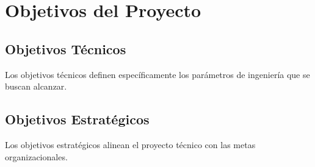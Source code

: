 \section{Objetivos del Proyecto}

\subsection{Objetivos Técnicos}
Los objetivos técnicos definen específicamente los parámetros de ingeniería que se buscan alcanzar.

\subsection{Objetivos Estratégicos}
Los objetivos estratégicos alinean el proyecto técnico con las metas organizacionales.